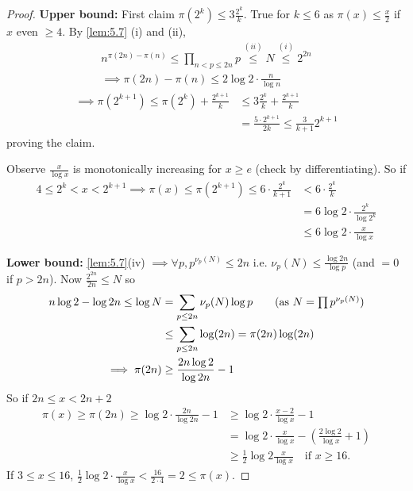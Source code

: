 \documentclass{article}
\begin{document}
\begin{proof}
    \textbf{Upper bound:} First claim $\pi(2^k) \leq 3 \frac{2^k}{k}$.
    True for $k \leq 6$ as $\pi(x) \leq \frac{x}{2}$ if $x$ even $\geq 4$.
    By \cref{lem:5.7} (i) and (ii),
    \begin{gather*}
        n^{\pi(2n) - \pi(n)} \leq \prod_{n < p \leq 2n} p \overset{(ii)}{\leq} N \overset{(i)}{\leq} 2^{2n} \\
        \implies \pi(2n) - \pi(n) \leq 2 \log 2 \cdot \frac{n}{\log n}
    \end{gather*}
    \begin{align*}
        \implies \pi(2^{k+1}) \leq \pi(2^k) + \frac{2^{k+1}}{k} &\leq 3 \frac{2^k}{k} + \frac{2^{k+1}}{k} \tag{induction on $k$} \\
                                                                &= \frac{5 \cdot 2^{k+1}}{2k} \leq \frac{3}{k+1} 2^{k+1} \tag{$k \geq 5$}
    \end{align*}
    proving the claim.

    Observe $\frac{x}{\log x}$ is monotonically increasing for $x \geq e$ (check by differentiating).
    So if
    \begin{align*}
        4 \leq 2^k < x < 2^{k+1} \implies \pi(x) \leq \pi(2^{k+1}) \leq 6 \cdot \frac{2^k}{k+1} &< 6 \cdot \frac{2^k}{k} \\
                                                                                                &= 6 \log 2 \cdot \frac{2^k}{\log 2^k} \\
                                                                                                &\leq 6 \log 2 \cdot \frac{x}{\log x}
    \end{align*}

    \textbf{Lower bound:} \cref{lem:5.7}(iv) $\implies \forall p, p^{\nu_p(N)} \leq 2n$ i.e. $\nu_p(N) \leq \frac{\log 2n}{\log p}$ (and $=0$ if $p>2n$).
    Now $\frac{2^{2n}}{2n} \leq N$ so
    \begin{align*}
        n \log 2 - \log 2n \leq \log N &= \sum_{p \leq 2n} \nu_p(N) \log p \tag{as $N = \prod p^{\nu_p(N)}$} \\
                                       &\leq \sum_{p \leq 2n} \log(2n) = \pi(2n) \log(2n) \\
        \implies \pi(2n) &\geq \frac{2n \log 2}{\log 2n} - 1
    \end{align*}
    So if $2n \leq x < 2n+2$
    \begin{align*}
        \pi(x) \geq \pi(2n) \geq \log 2 \cdot \frac{2n}{\log 2n} - 1 &\geq \log 2 \cdot \frac{x-2}{\log x} - 1 \\
                                                                     &= \log 2 \cdot \frac{x}{\log x} - \left(\frac{2\log 2}{\log x} + 1\right) \\
                                                                     &\geq \frac{1}{2} \log 2 \frac{x}{\log x} \quad \text{if } x \geq 16.
    \end{align*}
    If $3 \leq x \leq 16$, $\frac{1}{2} \log 2 \cdot \frac{x}{\log x} < \frac{16}{2 \cdot 4} = 2 \leq \pi(x)$.
\end{proof}
\end{document}
